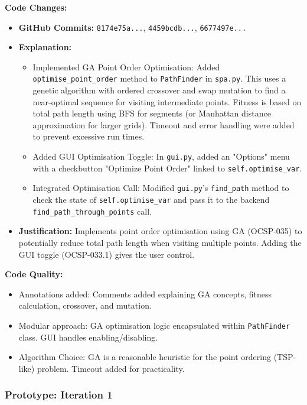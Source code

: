 \textbf{Code Changes:}
\begin{itemize}
	\item \textbf{GitHub Commits:} \verb|8174e75a...|, \verb|4459bcdb...|, \verb|6677497e...|
	\item \textbf{Explanation:}
	\begin{itemize}
		\item Implemented GA Point Order Optimisation: Added \verb|optimise_point_order| method to \verb|PathFinder| in \verb|spa.py|. This uses a genetic algorithm with ordered crossover and swap mutation to find a near-optimal sequence for visiting intermediate points. Fitness is based on total path length using BFS for segments (or Manhattan distance approximation for larger grids). Timeout and error handling were added to prevent excessive run times.
		\item Added GUI Optimisation Toggle: In \verb|gui.py|, added an "Options" menu with a checkbutton "Optimize Point Order" linked to \verb|self.optimise_var|.
		\item Integrated Optimisation Call: Modified \verb|gui.py|'s \verb|find_path| method to check the state of \verb|self.optimise_var| and pass it to the backend \verb|find_path_through_points| call.
	\end{itemize}
	\item \textbf{Justification:} Implements point order optimisation using GA (OCSP-035) to potentially reduce total path length when visiting multiple points. Adding the GUI toggle (OCSP-033.1) gives the user control.
\end{itemize}

\textbf{Code Quality:}
\begin{itemize}
	\item Annotations added: Comments added explaining GA concepts, fitness calculation, crossover, and mutation.
	\item Modular approach: GA optimisation logic encapsulated within \verb|PathFinder| class. GUI handles enabling/disabling.
	\item Algorithm Choice: GA is a reasonable heuristic for the point ordering (TSP-like) problem. Timeout added for practicality.
\end{itemize}

\subsubsection*{Prototype: Iteration 1}



